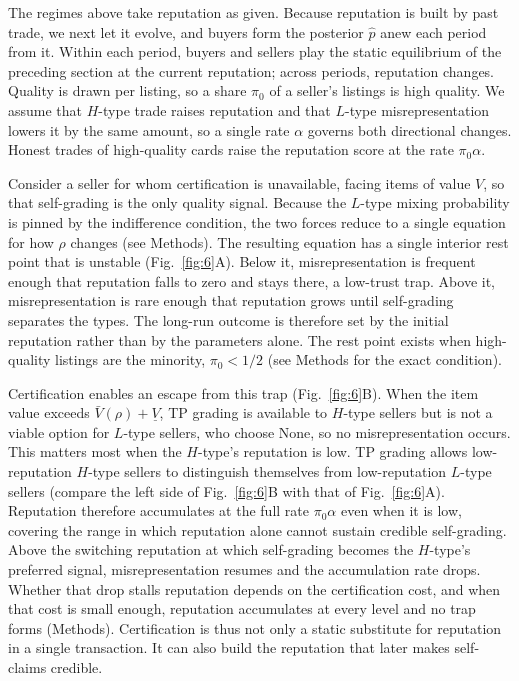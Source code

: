 \documentclass[11pt,letterpaper]{article}
\theoremstyle{definition}
\begin{document}
The regimes above take reputation as given. Because reputation is built by past trade, we next let it evolve, and buyers form the posterior $\hat{p}$ anew each period from it. Within each period, buyers and sellers play the static equilibrium of the preceding section at the current reputation; across periods, reputation changes. Quality is drawn per listing, so a share $\pi_0$ of a seller's listings is high quality. We assume that $H$-type trade raises reputation and that $L$-type misrepresentation lowers it by the same amount, so a single rate $\alpha$ governs both directional changes. Honest trades of high-quality cards raise the reputation score at the rate $\pi_0\alpha$.

Consider a seller for whom certification is unavailable, facing items of value $V$, so that self-grading is the only quality signal. Because the $L$-type mixing probability is pinned by the indifference condition, the two forces reduce to a single equation for how $\rho$ changes (see Methods). The resulting equation has a single interior rest point that is unstable (Fig.~\ref{fig:6}A). Below it, misrepresentation is frequent enough that reputation falls to zero and stays there, a low-trust trap. Above it, misrepresentation is rare enough that reputation grows until self-grading separates the types. The long-run outcome is therefore set by the initial reputation rather than by the parameters alone. The rest point exists when high-quality listings are the minority, $\pi_0 < 1/2$ (see Methods for the exact condition).

Certification enables an escape from this trap (Fig.~\ref{fig:6}B). When the item value exceeds $\bar{V}(\rho) + \underline{V}$, TP grading is available to $H$-type sellers but is not a viable option for $L$-type sellers, who choose None, so no misrepresentation occurs. This matters most when the $H$-type's reputation is low. TP grading allows low-reputation $H$-type sellers to distinguish themselves from low-reputation $L$-type sellers (compare the left side of Fig.~\ref{fig:6}B with that of Fig.~\ref{fig:6}A). Reputation therefore accumulates at the full rate $\pi_0\alpha$ even when it is low, covering the range in which reputation alone cannot sustain credible self-grading. Above the switching reputation at which self-grading becomes the $H$-type's preferred signal, misrepresentation resumes and the accumulation rate drops. Whether that drop stalls reputation depends on the certification cost, and when that cost is small enough, reputation accumulates at every level and no trap forms (Methods). Certification is thus not only a static substitute for reputation in a single transaction. It can also build the reputation that later makes self-claims credible.
\end{document}
